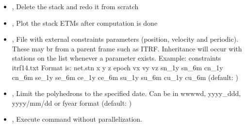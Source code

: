 \documentclass[letterpaper,10pt,english]{sphinxmanual}
\begin{document}
\begin{itemize}
\item {} 
\sphinxAtStartPar
{\hyperref[\detokenize{stacker:Stacker.py--redo}]{}}, {\hyperref[\detokenize{stacker:Stacker.py---redo_stack}]{}} \sphinxhyphen{} Delete the stack and redo it from scratch

\item {} 
\sphinxAtStartPar
{\hyperref[\detokenize{stacker:Stacker.py--plot}]{}}, {\hyperref[\detokenize{stacker:Stacker.py---plot_stack_etms}]{}} \sphinxhyphen{} Plot the stack ETMs after computation is done

\item {} 
\sphinxAtStartPar
{\hyperref[\detokenize{stacker:Stacker.py--constraints}]{}} , {\hyperref[\detokenize{stacker:Stacker.py---external_constraints}]{}}  \sphinxhyphen{} File with external constraints parameters (position, velocity and periodic). These may br from a parent frame such as ITRF. Inheritance will occur with stations on the list whenever a parameter exists. Example: \sphinxhyphen{}constraints itrf14.txt Format is: net.stn x y z epoch vx vy vz sn\_1y sn\_6m cn\_1y cn\_6m se\_1y se\_6m ce\_1y ce\_6m su\_1y su\_6m cu\_1y cu\_6m (default: )

\item {} 
\sphinxAtStartPar
{\hyperref[\detokenize{stacker:Stacker.py--d}]{}} , {\hyperref[\detokenize{stacker:Stacker.py---date_end}]{}}  \sphinxhyphen{} Limit the polyhedrons to the specified date. Can be in wwww\sphinxhyphen{}d, yyyy\_ddd, yyyy/mm/dd or fyear format (default: )

\item {} 
\sphinxAtStartPar
{\hyperref[\detokenize{stacker:Stacker.py--np}]{}}, {\hyperref[\detokenize{stacker:Stacker.py---noparallel}]{}} \sphinxhyphen{} Execute command without parallelization.

\end{itemize}
\end{document}
